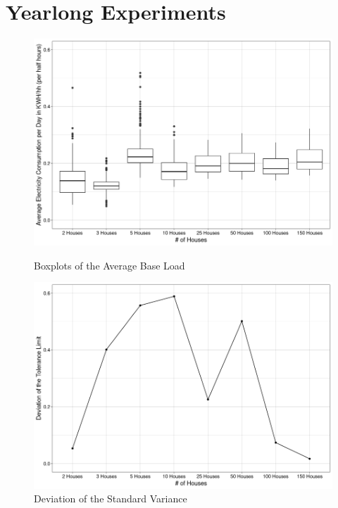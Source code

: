 \chapter{Yearlong Experiments}
\enlargethispage{10}
\vspace*{-10\baseline}
\begin{figure}[H]
\centering
\includegraphics[width=0.8\columnwidth]{images/boxplot_neu_neu.png}
\caption[Boxplots of the Average Base Load]{Boxplots of the Average Base Load}
\label{img:Box}
\centering
\includegraphics[width=0.8\columnwidth]{images/Deviation_Houses.png}
\caption[Deviation of the Standard Variance]{Deviation of the Standard Variance}
\label{img:Deviation}
\end{figure}
\nopagebreak
